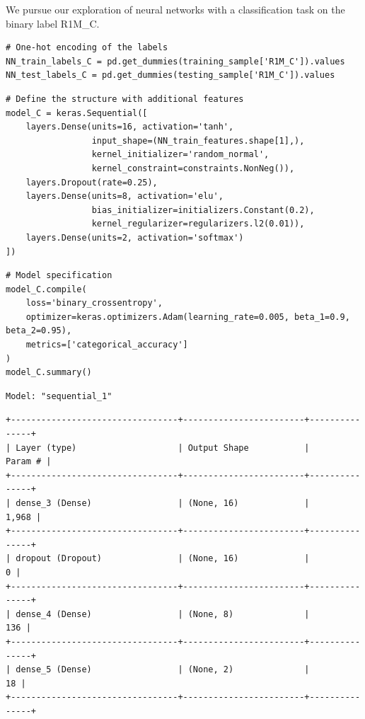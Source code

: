 We pursue our exploration of neural networks with a classification task on the binary label R1M\_C.

\begin{verbatim}
# One-hot encoding of the labels
NN_train_labels_C = pd.get_dummies(training_sample['R1M_C']).values
NN_test_labels_C = pd.get_dummies(testing_sample['R1M_C']).values
\end{verbatim}

\begin{verbatim}
# Define the structure with additional features
model_C = keras.Sequential([
    layers.Dense(units=16, activation='tanh',
                 input_shape=(NN_train_features.shape[1],),
                 kernel_initializer='random_normal',
                 kernel_constraint=constraints.NonNeg()),
    layers.Dropout(rate=0.25),
    layers.Dense(units=8, activation='elu',
                 bias_initializer=initializers.Constant(0.2),
                 kernel_regularizer=regularizers.l2(0.01)),
    layers.Dense(units=2, activation='softmax')
])
\end{verbatim}

\begin{verbatim}
# Model specification
model_C.compile(
    loss='binary_crossentropy',
    optimizer=keras.optimizers.Adam(learning_rate=0.005, beta_1=0.9, beta_2=0.95),
    metrics=['categorical_accuracy']
)
model_C.summary()
\end{verbatim}

\begin{verbatim}
Model: "sequential_1"
\end{verbatim}

\begin{verbatim}
+---------------------------------+------------------------+---------------+
| Layer (type)                    | Output Shape           |       Param # |
+---------------------------------+------------------------+---------------+
| dense_3 (Dense)                 | (None, 16)             |         1,968 |
+---------------------------------+------------------------+---------------+
| dropout (Dropout)               | (None, 16)             |             0 |
+---------------------------------+------------------------+---------------+
| dense_4 (Dense)                 | (None, 8)              |           136 |
+---------------------------------+------------------------+---------------+
| dense_5 (Dense)                 | (None, 2)              |            18 |
+---------------------------------+------------------------+---------------+
\end{verbatim}

